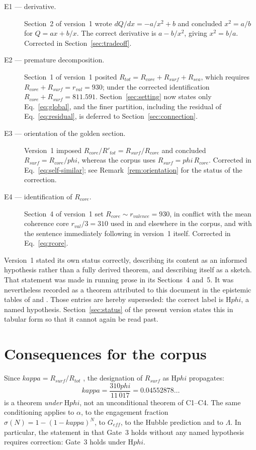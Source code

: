 \documentclass[11pt,a4paper]{article}
\def\varphi{phi}%
\def\mathrm#1{#1}%
\def\kappa{kappa}%
\theoremstyle{definition}
\theoremstyle{plain}
\theoremstyle{remark}
\newcommand{\Rcore}{R_{\mathrm{core}}}
\newcommand{\Rsurf}{R_{\mathrm{surf}}}
\newcommand{\Rsea}{R_{\mathrm{sea}}}
\newcommand{\Rtot}{R_{\mathrm{tot}}}
\newcommand{\rval}{r_{\mathrm{val}}}
\begin{document}
\begin{description}
\item[E1 --- derivative.] Section~2 of version~1 wrote $dQ/dx = -a/x^2 + b$ and concluded $x^2 = a/b$ for $Q = ax + b/x$. The correct derivative is $a - b/x^2$, giving $x^2 = b/a$. Corrected in Section~\ref{sec:tradeoff}.
\item[E2 --- premature decomposition.] Section~1 of version~1 posited $\Rtot = \Rcore + \Rsurf + \Rsea$, which requires $\Rcore + \Rsurf = \rval = 930$; under the corrected identification $\Rcore + \Rsurf = 811.591$. Section~\ref{sec:setting} now states only Eq.~\eqref{eq:global}, and the finer partition, including the residual of Eq.~\eqref{eq:residual}, is deferred to Section~\ref{sec:connection}.
\item[E3 --- orientation of the golden section.] Version~1 imposed $\Rcore/R'_{\mathrm{tot}} = \Rsurf/\Rcore$ and concluded $\Rsurf = \Rcore/\varphi$, whereas the corpus uses $\Rsurf = \varphi\,\Rcore$. Corrected in Eq.~\eqref{eq:self-similar}; see Remark~\ref{rem:orientation} for the status of the correction.
\item[E4 --- identification of $\Rcore$.] Section~4 of version~1 set $\Rcore \sim r_{\mathrm{valence}} = 930$, in conflict with the mean coherence core $\rval/3 = 310$ used in \citet{PDL_D12} and elsewhere in the corpus, and with the sentence immediately following in version~1 itself. Corrected in Eq.~\eqref{eq:rcore}.
\end{description}

Version~1 stated its own status correctly, describing its content as an informed hypothesis rather than a fully derived theorem, and describing itself as a sketch. That statement was made in running prose in its Sections~4 and~5. It was nevertheless recorded as a theorem attributed to this document in the epistemic tables of \citet{PDL_D39} and \citet{PDL_D43}. Those entries are hereby superseded: the correct label is H$\varphi$, a named hypothesis. Section~\ref{sec:status} of the present version states this in tabular form so that it cannot again be read past.

\section{Consequences for the corpus}
\label{sec:consequences}

Since $\kappa = \Rsurf/\Rtot$ \citep{PDL_D39,PDL_D42}, the designation of $\Rsurf$ as H$\varphi$ propagates:
\[
\kappa = \frac{310\varphi}{11\,017} = 0.04552878\ldots
\]
is a theorem \emph{under} H$\varphi$, not an unconditional theorem of C1--C4. The same conditioning applies to $\alpha$, to the engagement fraction $\sigma(N) = 1-(1-\kappa)^N$, to $G_{\mathrm{eff}}$, to the Hubble prediction and to $\Lambda$. In particular, the statement in \citet{PDL_DM} that Gate~3 holds without any named hypothesis requires correction: Gate~3 holds under H$\varphi$.
\end{document}
